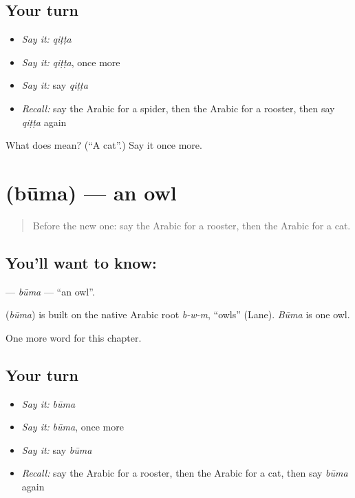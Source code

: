 \subsection*{Your turn}
\begin{itemize}
\raggedright
  \item \emph{Say it:} \emph{qiṭṭa}
  \item \emph{Say it:} \emph{qiṭṭa}, once more
  \item \emph{Say it:} say \emph{qiṭṭa}
  \item \emph{Recall:} say the Arabic for a spider, then the Arabic for a rooster, then say \emph{qiṭṭa} again
\end{itemize}

\begin{tcolorbox}[breakable,colback=teal!4,colframe=teal!35!black,title={Before you move on}]
What does  mean? (\textquotedblleft{}A cat\textquotedblright{}.) Say it once more.
\end{tcolorbox}
\section[\texorpdfstring{\ar{بومة} (būma)}{بومة (būma)}]{ (būma) — an owl}

\label{lesson:AR-C137-buma}



\begin{quote}
Before the new one: say the Arabic for a rooster, then the Arabic for a cat.
\end{quote}

\subsection*{You'll want to know: }
\textbf{} — \emph{būma} — \textquotedblleft{}an owl\textquotedblright{}.

\begin{cousinweb}
\textbf{} (\emph{būma}) is built on the native Arabic root \emph{b-w-m}, \textquotedblleft{}owls\textquotedblright{} (Lane). \emph{Būma} is one owl.
\end{cousinweb}

\begin{grammarlens}[title={What you've built}]
One more word for this chapter.
\end{grammarlens}

\subsection*{Your turn}
\begin{itemize}
\raggedright
  \item \emph{Say it:} \emph{būma}
  \item \emph{Say it:} \emph{būma}, once more
  \item \emph{Say it:} say \emph{būma}
  \item \emph{Recall:} say the Arabic for a rooster, then the Arabic for a cat, then say \emph{būma} again
\end{itemize}

